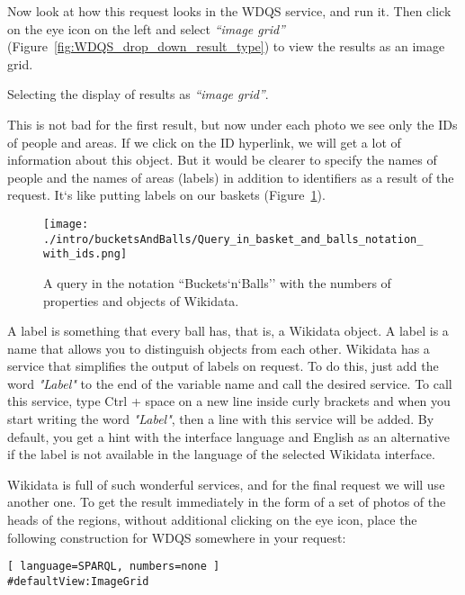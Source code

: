 Now look at how this request looks in the WDQS service, and run it. Then click on the eye icon on the left and select \textit{``image grid''} (Figure~\ref{fig:WDQS_drop_down_result_type}) to view the results as an image grid.

\begin{marginfigure}[-1cm]
	{
		\setlength{\fboxsep}{0pt}%
		\setlength{\fboxrule}{1pt}%
	}
    \caption{Selecting the display of results as \textit{``image grid''}.}
	\label{fig:WDQS_drop_down_result_type}
\end{marginfigure}

This is not bad for the first result, but now under each photo we see only the IDs of people and areas. If we click on the ID hyperlink, we will get a lot of information about this object. But it would be clearer to specify the names of people and the names of areas (labels) in addition to identifiers as a result of the request. It`s like putting labels on our baskets (Figure~\ref{fig:Query_in_basket_and_balls_notation_with_ids}).

\begin{figure}[h!]
\texttt{[image: ./intro/bucketsAndBalls/Query\_in\_basket\_and\_balls\_notation\_with\_ids.png]}
\caption{A query in the notation ``Buckets`n`Balls'' with the numbers of properties and objects of Wikidata.}
\label{fig:Query_in_basket_and_balls_notation_with_ids}
\end{figure}

A label is something that every ball has, that is, a Wikidata object. 
A label is a name that allows you to distinguish objects from each other. 
Wikidata has a service that simplifies the output of labels on request. 
To do this, just add the word \textit{"Label"} to the end of the variable name 
and call the desired service. 
To call this service, type Ctrl + space on a new line inside curly brackets 
and when you start writing the word \textit{"Label"}, 
then a line with this service will be added. By default, you get a hint with the interface language and English as an alternative if the label is not available in the language of the selected Wikidata interface.

Wikidata is full of such wonderful services, and for the final request we will use another one. To get the result immediately in the form of a set of photos of the heads of the regions, without additional clicking on the eye icon, place the following construction for WDQS somewhere in your request:
\begin{lstlisting}[ language=SPARQL, numbers=none ]
#defaultView:ImageGrid
\end{lstlisting}


